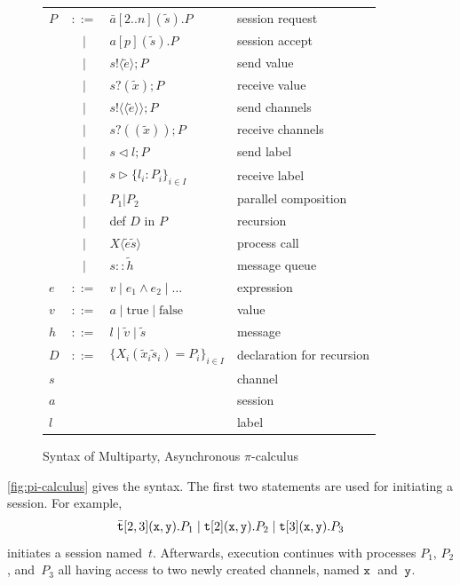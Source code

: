\documentclass[a4paper,12pt,oneside,fleqn]{book} %
\newcommand*\llangle{\mathopen{\langle\!\langle}}
\newcommand*\rrangle{\mathclose{\rangle\!\rangle}}
\begin{document}
\begin{figure} %
\begin{center}
\begin{tabular}{lcll}
  $P$ & $::=$ & $\bar{a}[2..n](\tilde{s}).P$ & session request
  \\  & $\mid$ & $a[p](\tilde{s}).P$  & session accept
  \\ & $\mid$  & $s!\langle\tilde{e}\rangle;P$ & send value
  \\ & $\mid$ & $s?(\tilde{x});P$ & receive value
  \\ & $\mid$  & $s!\llangle\tilde{e}\rrangle;P$ & send channels
  \\ & $\mid$ & $s?((\tilde{x}));P$ & receive channels
  \\ & $\mid$ & $s \triangleleft l; P$ & send label
  \\ & $\mid$ & $s \triangleright \{l_i:P_i\}_{i\in I}$ & receive label
  \\ & $\mid$ & $P_1|P_2$ & parallel composition
  \\ & $\mid$ & def $D$ in $P$ & recursion
  \\ & $\mid$ & $X\langle\tilde{e}\tilde{s}\rangle$ & process call
  \\ & $\mid$ & $s :: \tilde{h}$ & message queue
  \\
  $e$ & $::=$ & $v \mid e_1 \land e_2 \mid \ldots$ & expression
  \\
  $v$ & $::=$ & $a \mid \text{true} \mid \text{false}$ & value
  \\
  $h$ & $::=$ & $l \mid \tilde{v} \mid \tilde{s}$ & message
  \\
  $D$ & $::=$ & $\{X_i(\tilde{x}_i\tilde{s}_i)=P_i\}_{i\in I}$
    & declaration for recursion
  \\
  $s$ & & & channel
  \\
  $a$ & & & session
  \\
  $l$ & & & label
\end{tabular}
\end{center}
\caption{Syntax of Multiparty, Asynchronous $\pi$-calculus}
\label{fig:pi-calculus}
\end{figure} %

\autoref{fig:pi-calculus} gives the syntax.
The first two statements are used for initiating a session.
For example,
\begin{align}
  \bar{{\tt t}}[2,3]({\tt x},{\tt y}).P_1
  \mid
  {\tt t}[2]({\tt x},{\tt y}).P_2
  \mid
  {\tt t}[3]({\tt x},{\tt y}).P_3
\end{align}
initiates a session named~$t$.
Afterwards,
  execution continues with processes $P_1$, $P_2$, and~$P_3$
  all having access to two newly created channels,
    named ${\tt x}$~and~${\tt y}$.
\end{document}
